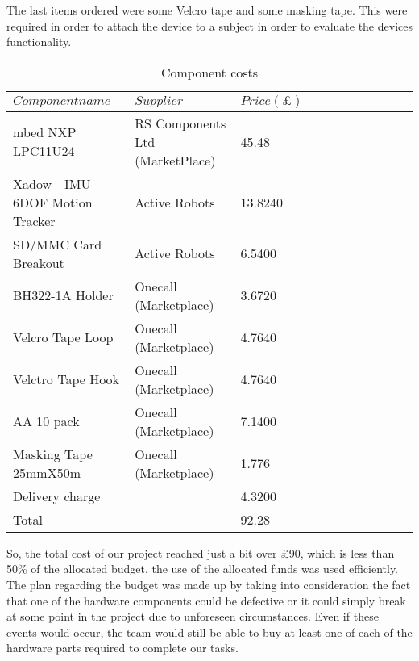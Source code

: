 The last items ordered were some Velcro tape and some masking tape. This were required in order to attach the device to a subject in order to evaluate the devices functionality.
\begin{table}[h]
	\centering
	\begin{tabular}{lllllllllll}
		\hline
		$Component name$ & $Supplier$ & $Price(\pounds)$ \\
		\hline
		mbed NXP LPC11U24 & RS Components Ltd (MarketPlace) & 45.48\\
		\hline
		Xadow - IMU 6DOF Motion Tracker & Active Robots & 13.8240 \\
		\hline
		SD/MMC Card Breakout & Active Robots & 6.5400 \\
		\hline
		BH322-1A  Holder &  Onecall (Marketplace) & 3.6720 \\
		\hline
		Velcro Tape Loop &  Onecall (Marketplace) & 4.7640 \\
		\hline
		Velctro Tape Hook &  Onecall (Marketplace) & 4.7640 \\
		\hline
		AA 10 pack &  Onecall (Marketplace) & 7.1400 \\
		\hline
		Masking Tape 25mmX50m &  Onecall (Marketplace) &1.776 \\
		\hline 
		Delivery charge &  & 4.3200	\\
		\hline	
		Total &  & 92.28 \\
	\end{tabular}
	\caption{Component costs}
	\label{table: 1}
\end{table}

So, the total cost of our project reached just a bit over £90, which is less than 50\% of the allocated budget,  the use of the allocated funds was used efficiently. The plan regarding the budget was made up by taking into consideration the fact that one of the hardware components could be defective or it could simply break at some point in the project due to unforeseen circumstances. Even if these events would occur, the team would still be able to buy at least one of each of the hardware parts required to complete our tasks.